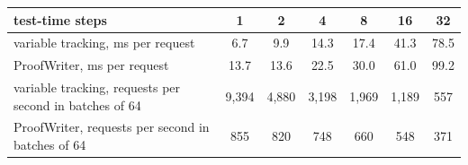 \begin{tabular}{lcccccc}
\toprule
test-time steps & 1 & 2 & 4 & 8 & 16 & 32 \\
\midrule
variable tracking, ms per request & 6.7 & 9.9 & 14.3 & 17.4 & 41.3 & 78.5 \\
ProofWriter, ms per request & 13.7 & 13.6 & 22.5 & 30.0 & 61.0 & 99.2 \\
variable tracking, requests per second in batches of 64 & 9,394 & 4,880 & 3,198 & 1,969 & 1,189 & 557 \\
ProofWriter, requests per second in batches of 64 & 855 & 820 & 748 & 660 & 548 & 371 \\
\bottomrule
\end{tabular}
